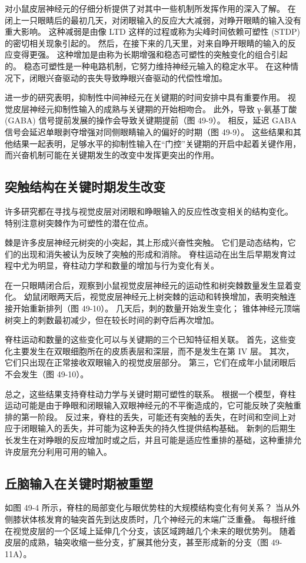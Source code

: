 对小鼠皮层神经元的仔细分析提供了对其中一些机制所发挥作用的深入了解。 在闭上一只眼睛后的最初几天，对闭眼输入的反应大大减弱，对睁开眼睛的输入没有重大影响。 这种减弱是由像 LTD 这样的过程或称为尖峰时间依赖可塑性 (STDP) 的密切相关现象引起的。 然后，在接下来的几天里，对来自睁开眼睛的输入的反应变得更强。 这种增加是由称为长期增强和稳态可塑性的突触变化的组合引起的。 稳态可塑性是一种电路机制，它努力维持神经元输入的稳定水平。 在这种情况下，闭眼兴奋驱动的丧失导致睁眼兴奋驱动的代偿性增加。

进一步的研究表明，抑制性中间神经元在关键期的时间安排中具有重要作用。 视觉皮层神经元抑制性输入的成熟与关键期的开始相吻合。 此外，导致 γ-氨基丁酸 (GABA) 信号提前发展的操作会导致关键期提前（图 49-9）。 相反，延迟 GABA 信号会延迟单眼剥夺增强对同侧眼睛输入的偏好的时期（图 49-9）。 这些结果和其他结果一起表明，足够水平的抑制性输入在“门控”关键期的开启中起着关键作用，而兴奋机制可能在关键期发生的改变中发挥更突出的作用。

\subsection{突触结构在关键时期发生改变}
许多研究都在寻找与视觉皮层对闭眼和睁眼输入的反应性改变相关的结构变化。 特别注意树突棘作为可塑性的潜在位点。

棘是许多皮层神经元树突的小突起，其上形成兴奋性突触。 它们是动态结构，它们的出现和消失被认为反映了突触的形成和消除。 脊柱运动在出生后早期发育过程中尤为明显，脊柱动力学和数量的增加与行为变化有关。

在一只眼睛闭合后，观察到小鼠视觉皮层神经元的运动性和树突棘数量发生显着变化。 幼鼠闭眼两天后，视觉皮层神经元上树突棘的运动和转换增加，表明突触连接开始重新排列（图 49-10）。 几天后，刺的数量开始发生变化； 锥体神经元顶端树突上的刺数最初减少，但在较长时间的剥夺后再次增加。

脊柱运动和数量的这些变化可以与关键期的三个已知特征相关联。 首先，这些变化主要发生在双眼细胞所在的皮质表层和深层，而不是发生在第 IV 层。 其次，它们只出现在正常接收双眼输入的视觉皮层部分。 第三，它们在成年小鼠闭眼后不会发生（图 49-10）。

总之，这些结果支持脊柱动力学与关键时期可塑性的联系。 根据一个模型，脊柱运动可能是由于睁眼和闭眼输入双眼神经元的不平衡造成的，它可能反映了突触重排的第一阶段。 反过来，脊柱的丢失，可能还有突触的丢失，在时间和空间上对应于闭眼输入的丢失，并可能为这种丢失的持久性提供结构基础。 新刺的后期生长发生在对睁眼的反应增加时或之后，并且可能是适应性重排的基础，这种重排允许皮层充分利用可用的输入。

\subsection{丘脑输入在关键时期被重塑}
如图 49-4 所示，脊柱的局部变化与眼优势柱的大规模结构变化有何关系？ 当从外侧膝状体核发育的轴突首先到达皮质时，几个神经元的末端广泛重叠。 每根纤维在视觉皮层的一个区域上延伸几个分支，该区域跨越几个未来的眼优势列。 随着皮层的成熟，轴突收缩一些分支，扩展其他分支，甚至形成新的分支（图 49-11A）。

